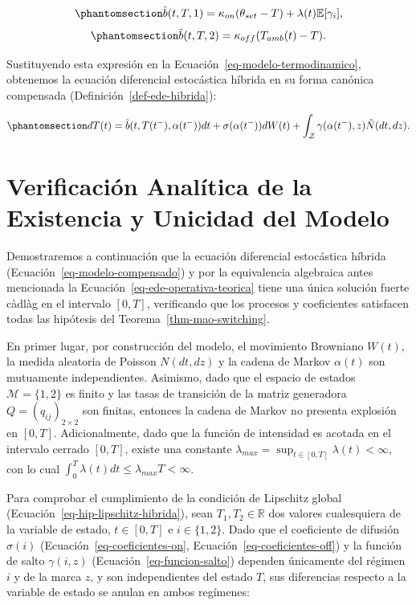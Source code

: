 \documentclass[
  spanish,
  letterpaper,
  DIV=11,
  numbers=noendperiod]{scrreprt}
\theoremstyle{plain}
\theoremstyle{plain}
\theoremstyle{plain}
\theoremstyle{definition}
\theoremstyle{remark}
\begin{document}
\begin{equation}\phantomsection\label{eq-deriva-compensada-on}{
\tilde{b}(t, T, 1) = \kappa_{on}(\theta_{set} - T) + \lambda(t)\mathbb{E}[\gamma_i],
}\end{equation}
\begin{equation}\phantomsection\label{eq-deriva-compensada-off}{
\tilde{b}(t, T, 2) = \kappa_{off}(T_{amb}(t) - T).
}\end{equation}

Sustituyendo esta expresión en la
Ecuación~\ref{eq-modelo-termodinamico}, obtenemos la ecuación
diferencial estocástica híbrida en su forma canónica compensada
(Definición~\ref{def-ede-hibrida}):

\begin{equation}\phantomsection\label{eq-modelo-compensado}{
dT(t) = \tilde{b}(t, T(t^-), \alpha(t^-)) dt + \sigma(\alpha(t^-)) dW(t) + \int_{\mathcal{Z}} \gamma(\alpha(t^-), z) \tilde{N}(dt, dz).
}\end{equation}

\section{Verificación Analítica de la Existencia y Unicidad del
Modelo}\label{verificaciuxf3n-analuxedtica-de-la-existencia-y-unicidad-del-modelo}

Demostraremos a continuación que la ecuación diferencial estocástica
híbrida (Ecuación~\ref{eq-modelo-compensado}) y por la equivalencia
algebraica antes mencionada la Ecuación~\ref{eq-ede-operativa-teorica}
tiene una única solución fuerte càdlàg en el intervalo \([0, T]\),
verificando que los procesos y coeficientes satisfacen todas las
hipótesis del Teorema~\ref{thm-mao-switching}.

En primer lugar, por construcción del modelo, el movimiento Browniano
\(W(t)\), la medida aleatoria de Poisson \(N(dt, dz)\) y la cadena de
Markov \(\alpha(t)\) son mutuamente independientes. Asimismo, dado que
el espacio de estados \(\mathcal{M} = \{1, 2\}\) es finito y las tasas
de transición de la matriz generadora \(Q = (q_{ij})_{2 \times 2}\) son
finitas, entonces la cadena de Markov no presenta explosión en
\([0, T]\). Adicionalmente, dado que la función de intensidad es acotada
en el intervalo cerrado \([0, T]\), existe una constante
\(\displaystyle \lambda_{max} = \sup_{t \in [0, T]} \lambda(t) < \infty\),
con lo cual
\(\displaystyle \int_0^T \lambda(t)dt \le \lambda_{max}T < \infty\).

Para comprobar el cumplimiento de la condición de Lipschitz global
(Ecuación~\ref{eq-hip-lipschitz-hibrida}), sean
\(T_1, T_2 \in \mathbb{R}\) dos valores cualesquiera de la variable de
estado, \(t \in [0, T]\) e \(i \in \{1, 2\}\). Dado que el coeficiente
de difusión \(\sigma(i)\) (Ecuación~\ref{eq-coeficientes-on},
Ecuación~\ref{eq-coeficientes-off}) y la función de salto
\(\gamma(i, z)\) (Ecuación~\ref{eq-funcion-salto}) dependen únicamente
del régimen \(i\) y de la marca \(z\), y son independientes del estado
\(T\), sus diferencias respecto a la variable de estado se anulan en
ambos regímenes:
\end{document}
